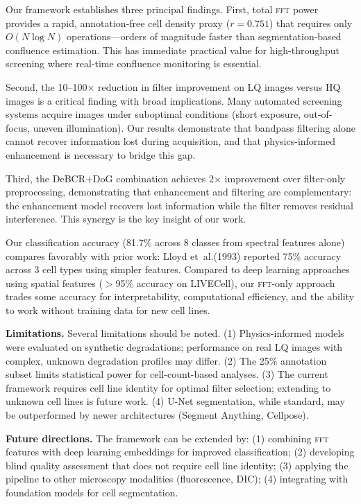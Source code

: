 \documentclass[11pt,a4paper]{article}
\newcommand{\etal}{et~al.\xspace}
\newcommand{\fft}{\textsc{fft}\xspace}
\begin{document}
Our framework establishes three principal findings. First, total \fft power provides a rapid, annotation-free cell density proxy ($r{=}0.751$) that requires only $O(N\log N)$ operations---orders of magnitude faster than segmentation-based confluence estimation. This has immediate practical value for high-throughput screening where real-time confluence monitoring is essential.

Second, the 10--100$\times$ reduction in filter improvement on LQ images versus HQ images is a critical finding with broad implications. Many automated screening systems acquire images under suboptimal conditions (short exposure, out-of-focus, uneven illumination). Our results demonstrate that bandpass filtering alone cannot recover information lost during acquisition, and that physics-informed enhancement is necessary to bridge this gap.

Third, the DeBCR+DoG combination achieves 2$\times$ improvement over filter-only preprocessing, demonstrating that enhancement and filtering are complementary: the enhancement model recovers lost information while the filter removes residual interference. This synergy is the key insight of our work.

Our classification accuracy (81.7\% across 8 classes from spectral features alone) compares favorably with prior work: Lloyd \etal (1993) reported 75\% accuracy across 3 cell types using simpler features. Compared to deep learning approaches using spatial features ($>$95\% accuracy on LIVECell), our \fft-only approach trades some accuracy for interpretability, computational efficiency, and the ability to work without training data for new cell lines.

\textbf{Limitations.} Several limitations should be noted. (1) Physics-informed models were evaluated on synthetic degradations; performance on real LQ images with complex, unknown degradation profiles may differ. (2) The 25\% annotation subset limits statistical power for cell-count-based analyses. (3) The current framework requires cell line identity for optimal filter selection; extending to unknown cell lines is future work. (4) U-Net segmentation, while standard, may be outperformed by newer architectures (Segment Anything, Cellpose).

\textbf{Future directions.} The framework can be extended by: (1) combining \fft features with deep learning embeddings for improved classification; (2) developing blind quality assessment that does not require cell line identity; (3) applying the pipeline to other microscopy modalities (fluorescence, DIC); (4) integrating with foundation models for cell segmentation.
\end{document}

